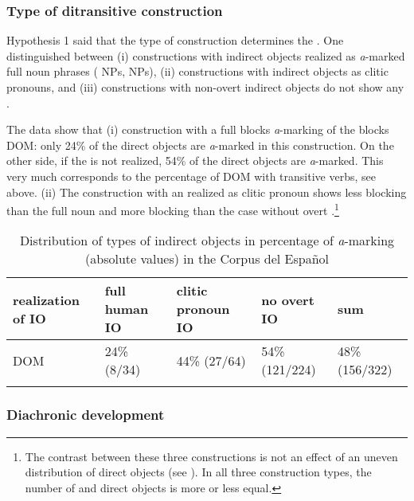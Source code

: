 \documentclass[output=paper]{LSP/langsci}
\begin{document}
\subsubsection{Type of ditransitive construction} %
\label{11-subsubsec:4-3-2}

Hypothesis 1 said that the type of  construction determines the . One distinguished between (i) constructions with indirect objects realized as \textit{a}-marked full noun phrases ( NPs,  NPs), (ii) constructions with indirect objects as clitic pronouns, and (iii) constructions with non-overt indirect objects do not show any .

The data show that (i) construction with a full  blocks \textit{a}-marking of the  blocks DOM: only 24\% of the direct objects are \textit{a}-marked in this construction. On the other side, if the  is not realized, 54\% of the direct objects are \textit{a}-marked. This very much corresponds to the percentage of DOM with transitive verbs, see  above. (ii) The construction with an  realized as clitic pronoun shows less blocking than the full noun and more blocking than the case without overt .\footnote{The contrast between these three constructions is not an effect of an uneven distribution of  \vs {} direct objects (see ). In all three construction types, the number of  and  direct objects is more or less equal.}

\begin{table}
\caption{Distribution of types of indirect objects in percentage of \textit{a}-marking (absolute values) in the Corpus del Español}
\label{11-he-tab:13}

\begin{tabularx}{\textwidth}{lllll}
\lsptoprule
 realization of IO &  full human IO &  clitic pronoun IO &  no overt IO& sum\\
 \midrule
 DOM &  24\% (8/34) &  44\% (27/64) &  54\% (121/224)& 48\% (156/322)\\
\lspbottomrule
\end{tabularx}
\end{table}

\subsubsection{Diachronic development} \label{11-subsubsec:4-3-3}
\end{document}
